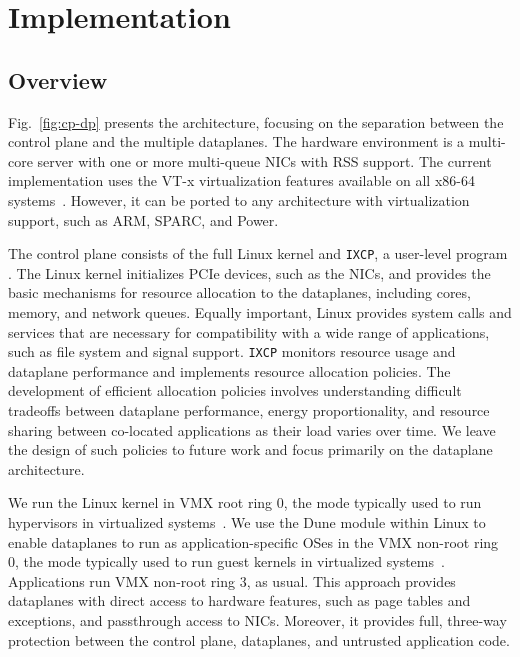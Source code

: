  
\section{\ix Implementation}
\label{sec:impl}





\subsection{Overview}
\label{sec:impl:overview}

Fig.~\ref{fig:cp-dp} presents the \ix architecture, focusing on the
separation between the control plane and the multiple dataplanes.  The
hardware environment is a multi-core server with one or more
multi-queue NICs with RSS support. The current \ix implementation uses
the VT-x virtualization features available on all x86-64
systems~\cite{DBLP:journals/computer/UhligNRSMABKLS05}. However, it
can be ported to any architecture with virtualization support, such as
ARM, SPARC, and Power.   

The \ix control plane consists of the full Linux kernel and
\texttt{IXCP}, a user-level program . The Linux kernel
initializes PCIe devices, such as the NICs, and provides the basic
mechanisms for resource allocation to the dataplanes, including cores,
memory, and network queues. Equally important, Linux provides system
calls and services that are necessary for compatibility with a wide
range of applications, such as file system and signal
support. \texttt{IXCP} monitors resource usage and dataplane
performance and implements resource allocation policies. The
development of efficient allocation policies involves understanding
difficult tradeoffs between dataplane performance, energy
proportionality, and resource sharing between co-located applications
as their load varies over time. We leave the design of such policies
to future work and focus primarily on the \ix dataplane architecture.

We run the Linux kernel in VMX root ring 0, the mode typically used to
run hypervisors in virtualized
systems~\cite{DBLP:journals/computer/UhligNRSMABKLS05}. We use the
Dune module within Linux to enable dataplanes to run as
application-specific OSes in the VMX non-root ring 0, the mode
typically used to run guest kernels in virtualized
systems~\cite{dune}.  Applications run VMX non-root ring 3, as usual.
This approach provides dataplanes with direct access to hardware
features, such as page tables and exceptions, and passthrough access
to NICs. Moreover, it provides full, three-way protection between the
control plane, dataplanes, and untrusted application code.


